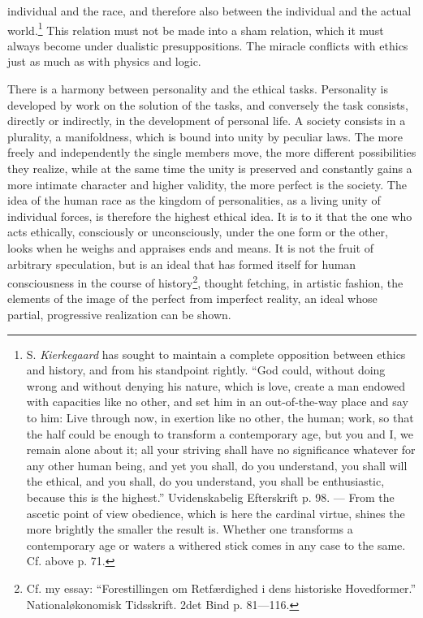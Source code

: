 \documentclass[12pt,a4paper,openany]{book}
\newcommand{\opage}[1]{\marginnote{\footnotesize\textit{[#1]}}}
\begin{document}
individual and the race, and therefore also between the individual and the
actual world.\footnote[1]{S. \emph{Kierkegaard} has sought to maintain a
complete opposition between ethics and history, and from his standpoint
rightly. ``God could, without doing wrong and without denying his nature,
which is love, create a man endowed with capacities like no other, and
set him in an out-of-the-way place and say to him: Live through now, in
exertion like no other, the human; work, so that the half could be enough
to transform a contemporary age, but you and I, we remain alone about it;
all your striving shall have no significance whatever for any other human
being, and yet you shall, do you understand, you shall will the ethical,
and you shall, do you understand, you shall be enthusiastic, because this
is the highest.'' Uvidenskabelig Efterskrift p. 98. --- From the ascetic
point of view obedience, which is here the cardinal virtue, shines the
more brightly the smaller the result is. Whether one transforms a
contemporary age or waters a withered stick comes in any case to the same.
Cf. above p. 71.} This relation must not be made into a sham relation,
which it must always become under dualistic presuppositions. The miracle
conflicts with ethics just as much as with physics and logic.

There is a harmony between personality and the ethical tasks. Personality
is developed by work on the solution of the tasks, and conversely the task
consists, directly or indirectly, in the development of personal life. A
society consists in a plurality, a manifoldness, which is bound into unity
by peculiar laws. The more freely and independently the single members
move, the more different \opage{103}possibilities they realize, while at
the same time the unity is preserved and constantly gains a more intimate
character and higher validity, the more perfect is the society. The idea
of the human race as the kingdom of personalities, as a living unity of
individual forces, is therefore the highest ethical idea. It is to it that
the one who acts ethically, consciously or unconsciously, under the one
form or the other, looks when he weighs and appraises ends and means. It is
not the fruit of arbitrary speculation, but is an ideal that has formed
itself for human consciousness in the course of history\footnote[1]{Cf.
my essay: ``Forestillingen om Retfærdighed i dens historiske
Hovedformer.'' Nationaløkonomisk Tidsskrift. 2det Bind p. 81---116.},
thought fetching, in artistic fashion, the elements of the image of the
perfect from imperfect reality, an ideal whose partial, progressive
realization can be shown.
\end{document}
